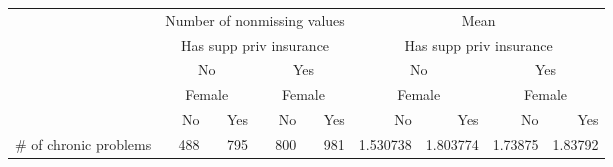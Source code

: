 \documentclass{article}
\begin{document}
\begin{table}[!h]
\centering
\begin{tabular}{lllllllll}
\cline{1-9}
\multicolumn{1}{c}{} &
  \multicolumn{4}{|c}{Number of nonmissing values} &
  \multicolumn{4}{c}{Mean} \\
\multicolumn{1}{c}{} &
  \multicolumn{4}{|c}{Has supp priv insurance} &
  \multicolumn{4}{c}{Has supp priv insurance} \\
\multicolumn{1}{c}{} &
  \multicolumn{2}{|c}{No} &
  \multicolumn{2}{c}{Yes} &
  \multicolumn{2}{c}{No} &
  \multicolumn{2}{c}{Yes} \\
\multicolumn{1}{c}{} &
  \multicolumn{2}{|c}{Female} &
  \multicolumn{2}{c}{Female} &
  \multicolumn{2}{c}{Female} &
  \multicolumn{2}{c}{Female} \\
\multicolumn{1}{c}{} &
  \multicolumn{1}{|r}{No} &
  \multicolumn{1}{r}{Yes} &
  \multicolumn{1}{r}{No} &
  \multicolumn{1}{r}{Yes} &
  \multicolumn{1}{r}{No} &
  \multicolumn{1}{r}{Yes} &
  \multicolumn{1}{r}{No} &
  \multicolumn{1}{r}{Yes} \\
\cline{1-9}
\multicolumn{1}{l}{\# of chronic problems} &
  \multicolumn{1}{|r}{488} &
  \multicolumn{1}{r}{795} &
  \multicolumn{1}{r}{800} &
  \multicolumn{1}{r}{981} &
  \multicolumn{1}{r}{1.530738} &
  \multicolumn{1}{r}{1.803774} &
  \multicolumn{1}{r}{1.73875} &
  \multicolumn{1}{r}{1.83792} \\
\cline{1-9}
\end{tabular}
\end{table}
\end{document}
